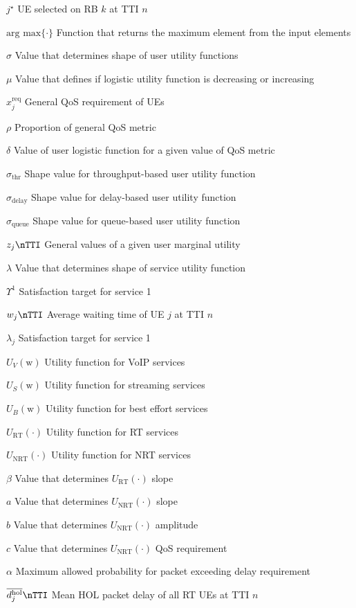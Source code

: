 \begin{simbolos}
	\item[$ j^{\star} $] UE selected on RB $k$ at TTI $n$
	\item[$ \text{arg max}\{\cdot\} $] Function that returns the maximum element from the input elements
	\item[$ \sigma $] Value that determines shape of user utility functions
	\item[$ \mu $] Value that defines if logistic utility function is decreasing or increasing
	\item[$ x_{j}^{\text{req}} $] General QoS requirement of UEs
	\item[$ \rho $] Proportion of general QoS metric
	\item[$ \delta $] Value of user logistic function for a given value of QoS metric
	\item[$ \sigma_{\text{thr}} $] Shape value for throughput-based user utility function
	\item[$ \sigma_{\text{delay}} $] Shape value for delay-based user utility function
	\item[$ \sigma_{\text{queue}} $] Shape value for queue-based user utility function
	\item[$ z_{j}\nTTI  $] General values of a given user marginal utility
	\item[$ \lambda $] Value that determines shape of service utility function
	\item[$ \Upsilon^{1} $] Satisfaction target for service 1
	\item[$ w_j \nTTI$] Average waiting time of UE $j$ at TTI $n$
	\item[$ \lambda_j $] Satisfaction target for service 1
	\item[$ U_V(\text{w}) $] Utility function for VoIP services
	\item[$ U_S(\text{w}) $] Utility function for streaming services
	\item[$ U_B(\text{w}) $] Utility function for best effort services	
	\item[$ U_{\text{RT}}( \cdot ) $] Utility function for RT services
	\item[$ U_{\text{NRT}}( \cdot ) $] Utility function for NRT services
	\item[$ \beta $] Value that determines $U_{\text{RT}}( \cdot )$ slope
	\item[$ a $] Value that determines $U_{\text{NRT}}( \cdot )$ slope
	\item[$ b $] Value that determines $U_{\text{NRT}}( \cdot )$ amplitude
	\item[$ c $] Value that determines $U_{\text{NRT}}( \cdot )$ QoS requirement
	\item[$ \alpha $] Maximum allowed probability for packet exceeding delay requirement
	\item[$ \overline{ d_{j}^{ \text{hol} } }\nTTI $] Mean HOL packet delay of all RT UEs at TTI $n$	
%	
\end{simbolos}
